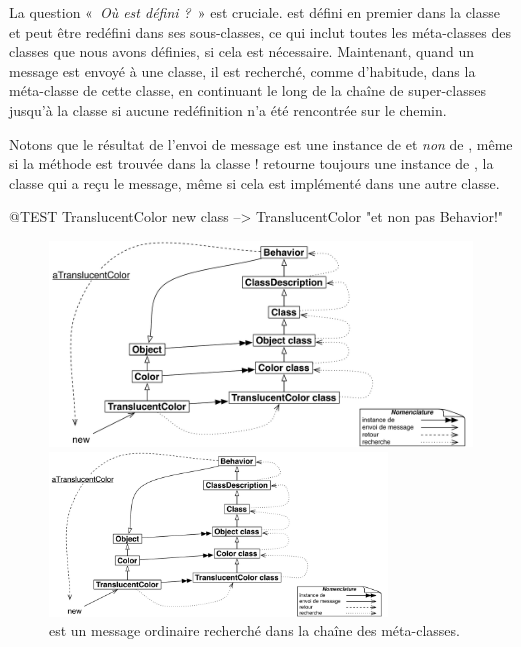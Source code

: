 \documentclass[a4paper,10pt,twoside]{book}
\begin{document}
La question «~\emph{Où est défini ?}~» est cruciale.
 est défini en premier dans la classe  et peut être redéfini dans ses sous-classes, ce qui inclut toutes les méta-classes des classes que nous avons définies, si cela est nécessaire.
Maintenant, quand un message  est envoyé à une classe, il est recherché, comme d'habitude, dans la méta-classe de cette classe, en continuant le long de la chaîne de super-classes jusqu'à la classe  si aucune redéfinition n'a été rencontrée sur le chemin.

Notons que le résultat de l'envoi de message  est une instance de    et \emph{non} de , même si la méthode est trouvée dans la classe !   retourne toujours une instance de \self , la classe qui a reçu le message, même si cela est implémenté dans une autre classe.

\begin{code}{@TEST}
TranslucentColor new class --> TranslucentColor    "et non pas Behavior!"
\end{code}

\begin{center}
\begin{figure}
\ifluluelse
	{\centerline{\includegraphics[width=\textwidth]{TranslucentSendingNew}}}
	{\centerline{\includegraphics[width=0.8\textwidth]{TranslucentSendingNew}}}
\caption{ est un message ordinaire recherché dans la chaîne des méta-classes.\label{fig:sendingnew}}
\end{figure}
\end{center}
\end{document}
